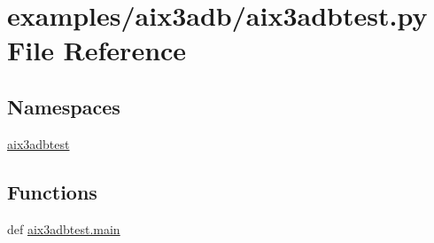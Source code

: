 \section{examples/aix3adb/aix3adbtest.py File Reference}
\label{aix3adbtest_8py}
\subsection*{Namespaces}
\begin{DoxyCompactItemize}
\item 
\hyperlink{namespaceaix3adbtest}{aix3adbtest}
\end{DoxyCompactItemize}
\subsection*{Functions}
\begin{DoxyCompactItemize}
\item 
def \hyperlink{namespaceaix3adbtest_a1f94dcb0d2f45832feb5111516fb685d}{aix3adbtest.\-main}
\end{DoxyCompactItemize}
